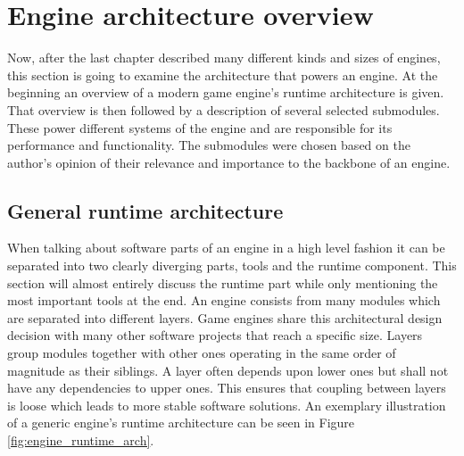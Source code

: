 \chapter{Engine architecture overview}

Now, after the last chapter described many different kinds and sizes of engines, this section is going to examine the architecture that powers an engine. At the beginning an overview of a modern game engine's runtime architecture is given. That overview is then followed by a description of several selected submodules. These power different systems of the engine and are responsible for its performance and functionality. The submodules were chosen based on the author's opinion of their relevance and importance to the backbone of an engine.

\section{General runtime architecture} \label{engine_runtime_arch}

When talking about software parts of an engine in a high level fashion it can be separated into two clearly diverging parts, tools and the runtime component. This section will almost entirely discuss the runtime part while only mentioning the most important tools at the end. An engine consists from many modules which are separated into different layers. Game engines share this architectural design decision with many other software projects that reach a specific size. Layers group modules together with other ones operating in the same order of magnitude as their siblings. A layer often depends upon lower ones but shall not have any dependencies to upper ones. This ensures that coupling between layers is loose which leads to more stable software solutions. An exemplary illustration of a generic engine's runtime architecture can be seen in Figure \ref{fig:engine_runtime_arch}.

